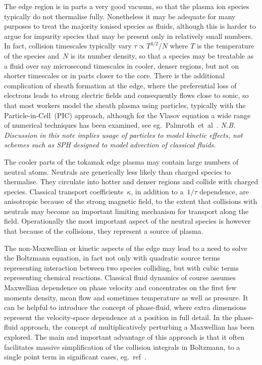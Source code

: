 The edge region is in parts a very good vacuum, so 
that the plasma ion species typically do not thermalise fully.
Nonetheless it may be adequate for many purposes to treat the majority ionised species as fluids,
although this is harder to argue for impurity species that may be present only in relatively
small numbers.
In fact, collision timescales typically vary $\tau\propto T^{3/2}/N$ where $T$ is the temperature of the species
and~$N$ is its number density, so that a species may be treatable as a fluid over say microsecond
timescales in cooler, denser regions, but not on shorter timescales or in parts closer to the core.
There is the additional complication of sheath formation at the edge, where the preferential
loss of electrons leads to strong electric fields and consequently flows close to sonic,
so that most workers model the sheath plasma using particles, typically with the Particle-in-Cell~(PIC)
approach, although for the Vlasov equation a wide range of numerical techniques has been examined,
see eg.\ Palmroth~et~al~\cite[\S\,4]{Pa18Vlas}.
\emph{N.B. Discussion in this note implies usage of particles to model kinetic effects,
not schemes such as SPH designed to model advection of classical fluids.}

The cooler parts of the tokamak edge plasma may contain large numbers of
neutral atoms.
Neutrals are generically less likely than charged species to thermalise.
They circulate into hotter and denser regions and collide with charged species.
Classical transport coefficients~$\kappa$, in
addition to a~$1/\tau$ dependence, are anisotropic because of the strong magnetic field,
to the extent that collisions with neutrals may become an important limiting mechanism
for transport along the field. Operationally the most important aspect of the
neutral species is however that because of the collisions, they
represent a source of plasma.

The non-Maxwellian or kinetic aspects of the edge may lead to a need to solve the
Boltzmann equation, in fact not only with quadratic source terms representing interaction
between two species colliding, but with cubic terms representing chemical reactions.
Classical fluid dynamics of course assumes Maxwellian dependence on phase velocity and
concentrates on the first few moments  density, mean flow and sometimes temperature
as well as pressure. It can be helpful to introduce
the concept of phase-fluid, where extra dimensions represent the velocity-space
dependence at a position in full detail.
In the phase-fluid approach, the concept of multiplicatively perturbing
a Maxwellian has been explored. The main and important advantage of this approach
is that it often facilitates massive simplification of the collision integrals
in Boltzmann, to a single point term in significant cases, eg.\ ref~\cite{zhdanov}.

